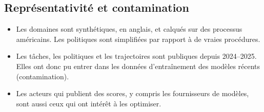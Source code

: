 \subsection{Représentativité et contamination}
\begin{itemize}
  \item Les domaines sont synthétiques, en anglais, et calqués sur des processus américains. Les politiques sont simplifiées par rapport à de vraies procédures.
  \item Les tâches, les politiques et les trajectoires sont publiques depuis 2024--2025. Elles ont donc pu entrer dans les données d'entraînement des modèles récents (contamination).
  \item Les acteurs qui publient des scores, y compris les fournisseurs de modèles, sont aussi ceux qui ont intérêt à les optimiser.
\end{itemize}
